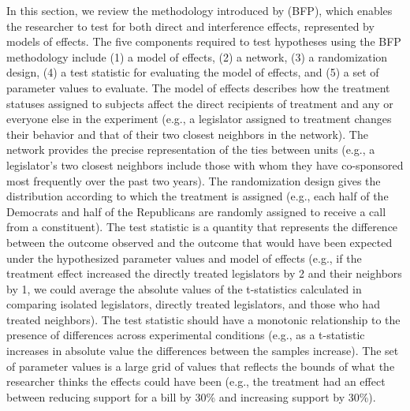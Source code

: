 \documentclass[12pt]{article}
\begin{document}
In this section, we review the methodology introduced by \citet{bowers2012reasoning} (BFP), which enables the researcher to test for both direct and interference effects, represented by models of effects. The five components required to test hypotheses using the BFP methodology include (1) a model of effects, (2) a network, (3) a randomization design, (4) a test statistic for evaluating the model of effects, and (5) a set of parameter values to evaluate. The model of effects describes how the treatment statuses assigned to subjects affect the direct recipients of treatment and any or everyone else in the experiment (e.g., a legislator assigned to treatment changes their behavior and that of their two closest neighbors in the network). The network provides the precise representation of the ties between units (e.g., a legislator's two closest neighbors include those with whom they have co-sponsored most frequently over the past two years). The randomization design gives the distribution according to which the treatment is assigned (e.g., each half of the Democrats and half of the Republicans are randomly assigned to receive a call from a constituent). The test statistic is a quantity that represents the difference between the outcome observed and the outcome that would have been expected under the hypothesized parameter values and model of effects (e.g., if the treatment effect increased the directly treated legislators by 2 and their neighbors by 1, we could average the absolute values of the t-statistics calculated in comparing isolated legislators, directly treated legislators, and those who had treated neighbors). The test statistic should have a monotonic relationship to the presence of differences across experimental conditions (e.g., as a t-statistic increases in absolute value the differences between the samples increase). The set of parameter values is a large grid of values that reflects the bounds of what the researcher thinks the effects could have been (e.g., the treatment had an effect between reducing support for a bill by 30\% and increasing support by 30\%). 
\end{document}

